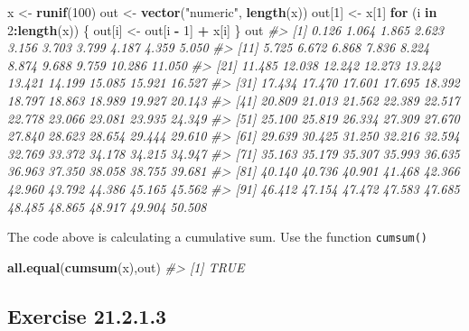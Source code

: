 \documentclass[]{book}
\newenvironment{Shaded}{\begin{snugshade}}{\end{snugshade}}
\newcommand{\CommentTok}[1]{\textcolor[rgb]{0.56,0.35,0.01}{\textit{#1}}}
\newcommand{\ControlFlowTok}[1]{\textcolor[rgb]{0.13,0.29,0.53}{\textbf{#1}}}
\newcommand{\DecValTok}[1]{\textcolor[rgb]{0.00,0.00,0.81}{#1}}
\newcommand{\KeywordTok}[1]{\textcolor[rgb]{0.13,0.29,0.53}{\textbf{#1}}}
\newcommand{\NormalTok}[1]{#1}
\newcommand{\OperatorTok}[1]{\textcolor[rgb]{0.81,0.36,0.00}{\textbf{#1}}}
\newcommand{\StringTok}[1]{\textcolor[rgb]{0.31,0.60,0.02}{#1}}
\theoremstyle{plain}
\theoremstyle{remark}
\begin{document}
\begin{Shaded}
\begin{Highlighting}[]
\NormalTok{x <-}\StringTok{ }\KeywordTok{runif}\NormalTok{(}\DecValTok{100}\NormalTok{)}
\NormalTok{out <-}\StringTok{ }\KeywordTok{vector}\NormalTok{(}\StringTok{"numeric"}\NormalTok{, }\KeywordTok{length}\NormalTok{(x))}
\NormalTok{out[}\DecValTok{1}\NormalTok{] <-}\StringTok{ }\NormalTok{x[}\DecValTok{1}\NormalTok{]}
\ControlFlowTok{for}\NormalTok{ (i }\ControlFlowTok{in} \DecValTok{2}\OperatorTok{:}\KeywordTok{length}\NormalTok{(x)) \{}
\NormalTok{  out[i] <-}\StringTok{ }\NormalTok{out[i }\OperatorTok{-}\StringTok{ }\DecValTok{1}\NormalTok{] }\OperatorTok{+}\StringTok{ }\NormalTok{x[i]}
\NormalTok{\}}
\NormalTok{out}
\CommentTok{#>   [1]  0.126  1.064  1.865  2.623  3.156  3.703  3.799  4.187  4.359  5.050}
\CommentTok{#>  [11]  5.725  6.672  6.868  7.836  8.224  8.874  9.688  9.759 10.286 11.050}
\CommentTok{#>  [21] 11.485 12.038 12.242 12.273 13.242 13.421 14.199 15.085 15.921 16.527}
\CommentTok{#>  [31] 17.434 17.470 17.601 17.695 18.392 18.797 18.863 18.989 19.927 20.143}
\CommentTok{#>  [41] 20.809 21.013 21.562 22.389 22.517 22.778 23.066 23.081 23.935 24.349}
\CommentTok{#>  [51] 25.100 25.819 26.334 27.309 27.670 27.840 28.623 28.654 29.444 29.610}
\CommentTok{#>  [61] 29.639 30.425 31.250 32.216 32.594 32.769 33.372 34.178 34.215 34.947}
\CommentTok{#>  [71] 35.163 35.179 35.307 35.993 36.635 36.963 37.350 38.058 38.755 39.681}
\CommentTok{#>  [81] 40.140 40.736 40.901 41.468 42.366 42.960 43.792 44.386 45.165 45.562}
\CommentTok{#>  [91] 46.412 47.154 47.472 47.583 47.685 48.485 48.865 48.917 49.904 50.508}
\end{Highlighting}
\end{Shaded}

The code above is calculating a cumulative sum. Use the function \texttt{cumsum()}

\begin{Shaded}
\begin{Highlighting}[]
\KeywordTok{all.equal}\NormalTok{(}\KeywordTok{cumsum}\NormalTok{(x),out)}
\CommentTok{#> [1] TRUE}
\end{Highlighting}
\end{Shaded}

\hypertarget{exercise-21.2.1.3}{%
\subsection*{\texorpdfstring{Exercise {21.2.1.3}}{Exercise 21.2.1.3}}\label{exercise-21.2.1.3}}
\end{document}
